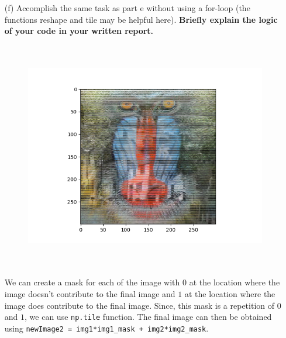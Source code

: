 \documentclass[11pt,oneside,notitlepage]{article}
\begin{document}
\begin{itemize}
	\item[(f)]
	Accomplish the same task as part e without using a for-loop (the functions reshape and
  tile may be helpful here). \textbf{Briefly explain the logic of your code in your written report.}
    \begin{figure}[H]
    \vspace{-0.5cm}
    \begin{center}
        \includegraphics[height=10cm]{ps0_template/p2f.png}
    \end{center}
    \end{figure}

    We can create a mask for each of the image with $0$ at the location where the image doesn't contribute to the final image and $1$ at the location where the image does contribute to the final image. Since, this mask is a repetition of $0$ and $1$, we can use \texttt{np.tile} function. The final image can then be obtained using \texttt{newImage2 = img1*img1\_mask + img2*img2\_mask}.
  

\end{itemize}
\end{document}
